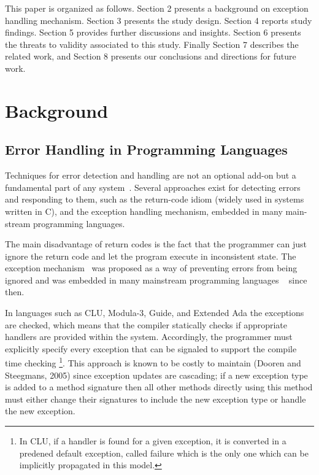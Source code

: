 \documentclass[conference]{IEEEtran}
\begin{document}
This paper is organized as follows. Section 2 presents a
background on exception handling mechanism. Section 3 presents the study design.
Section 4 reports study findings. Section 5 provides further discussions and insights.
Section 6 presents the threats to validity associated to this study. Finally Section
7 describes the related work, and Section 8 presents our conclusions and
directions for future work.


\section{Background}

\subsection{Error Handling in Programming Languages}

Techniques for error detection and handling are not  an optional add-on but a
fundamental part of any system~\cite{bruntink2006discovering}. Several
approaches exist for detecting errors and responding to them, such as the return-code 
idiom (widely used in systems written in C), and the exception handling 
mechanism, embedded in many main-stream programming languages.

The main disadvantage of return codes is the fact that the programmer can just
ignore the return code and let the program execute in inconsistent state. The
exception mechanism~\cite{goodenough1975exception} was proposed as a way of
preventing errors from being ignored and was embedded in many mainstream
programming languages ~\cite{garcia2001comparative} since then. 

In languages such as CLU, Modula-3, Guide, and Extended Ada the exceptions are 
checked, which means that the 
compiler statically checks if appropriate handlers are provided within the system. 
Accordingly, the programmer must explicitly specify every exception that can be
signaled to support the compile time checking \footnote{In CLU,  if a handler is 
found for a given exception, it is converted in a predened default exception, 
called failure which is the only one which can be implicitly 
propagated in this model.}. This approach is known to be
costly to maintain (Dooren and Steegmans, 2005) since exception updates are
cascading; if a new exception type is added to a method signature then all other
methods directly using this method must either change their signatures to
include the new exception type or handle the new exception. 
\end{document}
